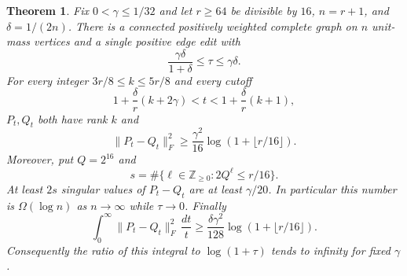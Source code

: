 \documentclass[11pt]{article}
\newtheorem{theorem}{Theorem}
\begin{document}
\begin{theorem}\label{thm:nogo}
Fix $0<\gamma\le1/32$ and let $r\ge64$ be divisible by $16$, $n=r+1$,
and $\delta=1/(2n)$. There is a connected positively weighted complete
graph on $n$ unit-mass vertices and a single positive edge edit with
\[
 \frac{\gamma\delta}{1+\delta}\le\tau\le\gamma\delta.
\]
For every integer $3r/8\le k\le5r/8$ and every cutoff
\[
 1+\frac\delta r(k+2\gamma)<t<1+\frac\delta r(k+1),
\]
$P_t,Q_t$ both have rank $k$ and
\begin{equation}\label{eq:HS}
 \|P_t-Q_t\|_F^2\ge\frac{\gamma^2}{16}
                       \log(1+\lfloor r/16\rfloor).
\end{equation}
Moreover, put $Q=2^{16}$ and
\[
 s=\#\{\ell\in\mathbb Z_{\ge0}: 2Q^\ell\le r/16\}.
\]
At least $2s$ singular values of $P_t-Q_t$ are at least $\gamma/20$.
In particular this number is $\Omega(\log n)$ as $n\to\infty$ while
$\tau\to0$. Finally
\begin{equation}\label{eq:intlower}
 \int_0^\infty\|P_t-Q_t\|_F^2\,\frac{dt}{t}
 \ge\frac{\delta\gamma^2}{128}
                       \log(1+\lfloor r/16\rfloor).
\end{equation}
Consequently the ratio of this integral to $\log(1+\tau)$ tends to
infinity for fixed $\gamma$.
\end{theorem}
\end{document}
